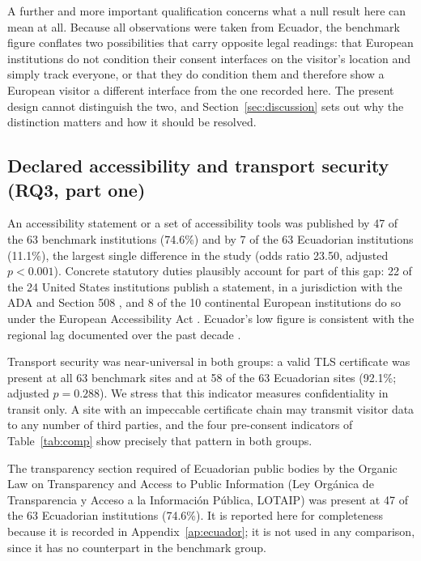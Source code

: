 \documentclass[]{interact}
\begin{document}
A further and more important qualification concerns what a null result here can mean at all. Because all observations were taken from Ecuador, the benchmark figure conflates two possibilities that carry opposite legal readings: that European institutions do not condition their consent interfaces on the visitor's location and simply track everyone, or that they do condition them and therefore show a European visitor a different interface from the one recorded here. The present design cannot distinguish the two, and Section~\ref{sec:discussion} sets out why the distinction matters and how it should be resolved.

\subsection{Declared accessibility and transport security (RQ3, part one)}\label{sec:results-declared}

An accessibility statement or a set of accessibility tools was published by 47 of the 63 benchmark institutions (74.6\%) and by 7 of the 63 Ecuadorian institutions (11.1\%), the largest single difference in the study (odds ratio 23.50, adjusted $p<0.001$). Concrete statutory duties plausibly account for part of this gap: 22 of the 24 United States institutions publish a statement, in a jurisdiction with the ADA and Section 508 \citep{ada1990,section508}, and 8 of the 10 continental European institutions do so under the European Accessibility Act \citep{eaa2019}. Ecuador's low figure is consistent with the regional lag documented over the past decade \citep{campoverdemolina2023accessibility,acostavargas2020dataset}.

Transport security was near-universal in both groups: a valid TLS certificate was present at all 63 benchmark sites and at 58 of the 63 Ecuadorian sites (92.1\%; adjusted $p=0.288$). We stress that this indicator measures confidentiality in transit only. A site with an impeccable certificate chain may transmit visitor data to any number of third parties, and the four pre-consent indicators of Table~\ref{tab:comp} show precisely that pattern in both groups.

The transparency section required of Ecuadorian public bodies by the Organic Law on Transparency and Access to Public Information (Ley Org\'anica de Transparencia y Acceso a la Informaci\'on P\'ublica, LOTAIP) was present at 47 of the 63 Ecuadorian institutions (74.6\%). It is reported here for completeness because it is recorded in Appendix~\ref{ap:ecuador}; it is not used in any comparison, since it has no counterpart in the benchmark group.
\end{document}
